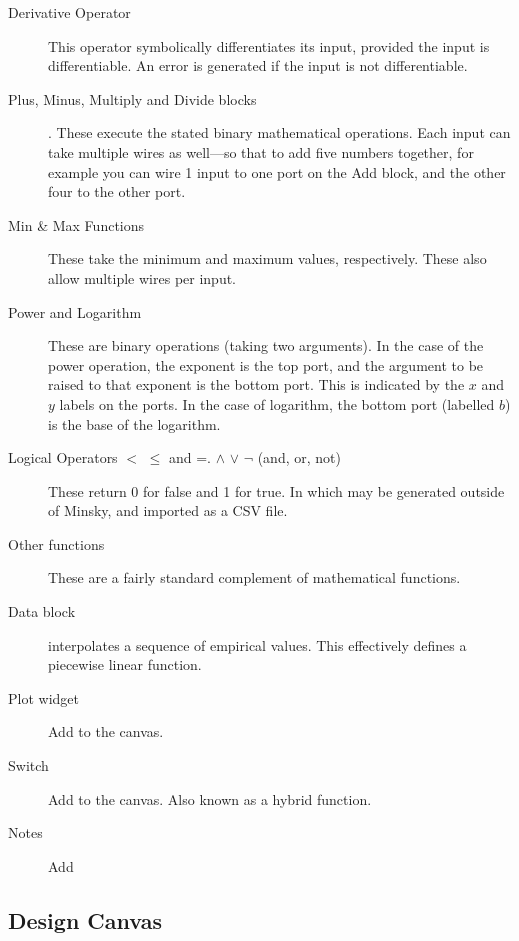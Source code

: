 \begin{description}
\item[Derivative Operator] This operator symbolically differentiates its input,
provided the input is differentiable. An error is generated if the input
is not differentiable.

\item[Plus, Minus, Multiply and Divide blocks]
    . These execute the stated binary
    mathematical operations. Each input can take multiple wires as
    well---so that to add five numbers together, for example you can wire 1 input
    to one port on the Add block, and the other four to the other
    port. 

\item[Min \& Max Functions] These take the minimum and maximum values, respectively.
These also allow multiple wires per input.

\item[Power and Logarithm] These are binary operations (taking two
arguments). In the case of the power operation, the exponent is the
top port, and the argument to be raised to that exponent is the bottom
port. This is indicated by the $x$ and $y$ labels on the ports. In the
case of logarithm, the bottom port (labelled $b$) is the base of the
logarithm.

\item[Logical Operators $<$ $\le$ and =. $\wedge$ $\vee$ $\neg$ (and,
  or, not)] These return 0 for false and 1 for true.  In which may be
  generated outside of Minsky, and imported as a CSV file.

\item[Other functions] These are a fairly standard
complement of mathematical functions.

\item[Data block]  interpolates a
sequence of empirical values. This effectively defines a piecewise linear function.

\item[Plot widget] Add  to the canvas.

\item[Switch] Add  
to the canvas. Also known as a hybrid function.

\item[Notes] Add 

\end{description}

\subsection{Design Canvas}
\label{DesignCanvas}


